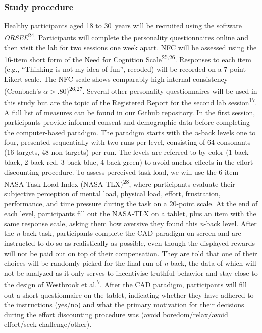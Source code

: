 \documentclass[
  man,floatsintext]{apa6}
\begin{document}
\hypertarget{study-procedure}{%
\subsubsection{Study procedure}\label{study-procedure}}

Healthy participants aged 18 to 30~years will be recruited using the software \emph{ORSEE}\textsuperscript{24}.
Participants will complete the personality questionnaires online and then visit the lab for two sessions one week apart.
NFC will be assessed using the 16-item short form of the Need for Cognition Scale\textsuperscript{25,26}.
Responses to each item (e.g., ``Thinking is not my idea of fun'', recoded) will be recorded on a 7-point Likert scale.
The NFC scale shows comparably high internal consistency (Cronbach's \(\alpha>.80\))\textsuperscript{26,27}.
Several other personality questionnaires will be used in this study but are the topic of the Registered Report for the second lab session\textsuperscript{17}.
A full list of measures can be found in our \href{https://github.com/ChScheffel/CAD}{Github repository}.
In the first session, participants provide informed consent and demographic data before completing the computer-based paradigm.
The paradigm starts with the \emph{n}-back levels one to four, presented sequentially with two runs per level, consisting of 64 consonants (16 targets, 48 non-targets) per run.
The levels are referred to by color (1-back black, 2-back red, 3-back blue, 4-back green) to avoid anchor effects in the effort discounting procedure.
To assess perceived task load, we will use the 6-item NASA Task Load Index (NASA-TLX)\textsuperscript{28}, where participants evaluate their subjective perception of mental load, physical load, effort, frustration, performance, and time pressure during the task on a 20-point scale.
At the end of each level, participants fill out the NASA-TLX on a tablet, plus an item with the same response scale, asking them how aversive they found this \emph{n}-back level.
After the \emph{n}-back task, participants complete the CAD paradigm on screen and are instructed to do so as realistically as possible, even though the displayed rewards will not be paid out on top of their compensation.
They are told that one of their choices will be randomly picked for the final run of \emph{n}-back, the data of which will not be analyzed as it only serves to incentivise truthful behavior and stay close to the design of Westbrook et al.\textsuperscript{7}.
After the CAD paradigm, participants will fill out a short questionnaire on the tablet, indicating whether they have adhered to the instructions (yes/no) and what the primary motivation for their decisions during the effort discounting procedure was (avoid boredom/relax/avoid effort/seek challenge/other).\\
\end{document}
